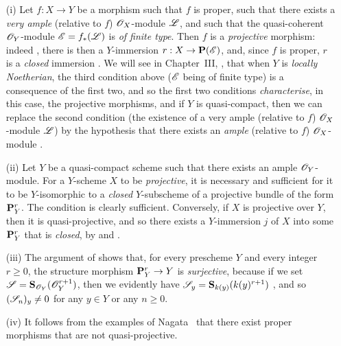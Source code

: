 \begin{remark}[5.5.4]
\label{II.5.5.4}
\medskip\noindent
\begin{enumerate}
  \item[(i)] Let $f:X\to Y$ be a morphism such that $f$ is proper, such that there exists a \emph{very ample} (relative to $f$) $\mathscr{O}_X$-module $\mathscr{L}$, and such that the quasi-coherent $\mathscr{O}_Y$-module $\mathscr{E}=f_*(\mathscr{L})$ is \emph{of finite type}.
    Then $f$ is a \emph{projective} morphism: indeed , there is then a $Y$-immersion $r:X\to\bb{P}(\sh{E})$, and, since $f$ is proper, $r$ is a \emph{closed} immersion .
    We will see in Chapter~III, , that when $Y$ is \emph{locally Noetherian}, the third condition above ($\mathscr{E}$ being of finite type) is a consequence of the first two, and so the first two conditions \emph{characterise}, in this case, the projective morphisms, and if $Y$ is quasi-compact, then we can replace the second condition (the existence of a very ample (relative to $f$) $\mathscr{O}_X$-module $\mathscr{L}$) by the hypothesis that there exists an \emph{ample} (relative to $f$) $\mathscr{O}_X$-module .
  \item[(ii)] Let $Y$ be a quasi-compact scheme such that there exists an ample $\mathscr{O}_Y$-module.
    For a $Y$-scheme $X$ to be \emph{projective}, it is necessary and sufficient for it to be $Y$-isomorphic to a \emph{closed} $Y$-subscheme of a projective bundle of the form $\mathbf{P}_Y^r$.
    The condition is clearly sufficient.
    Conversely, if $X$ is projective over $Y$, then it is quasi-projective, and so there exists a $Y$-immersion $j$ of $X$ into some $\mathbf{P}_Y^r$  that is \emph{closed}, by  and .
  \item[(iii)] The argument of  shows that, for every prescheme $Y$ and every integer $r\geq0$, the structure morphism $\bb{P}_Y^r\to Y$ is \emph{surjective}, because if we set $\mathscr{S}=\mathbf{S}_{\mathscr{O}_Y}(\mathscr{O}_Y^{r+1})$, then we evidently have $\mathscr{S}_y=\mathbf{S}_{k(y)}(k(y)^{r+1})$ , and so $(\mathscr{S}_n)_y\neq0$ for any $y\in Y$ or any $n\geq0$.
  \item[(iv)] It follows from the examples of Nagata~\cite{II-26} that there exist proper morphisms that are not quasi-projective.
\end{enumerate}
\end{remark}

